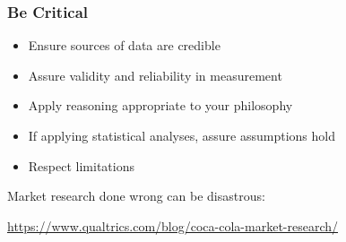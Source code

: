 \begin{frame}
	\frametitle{Be Critical}
	
	\begin{itemize}
		\item Ensure sources of data are credible
		\item Assure validity and reliability in measurement
		\item Apply reasoning appropriate to your philosophy
		\item If applying statistical analyses, assure assumptions hold
		\item Respect limitations
	\end{itemize}
	
	Market research done wrong can be disastrous:
	
	\vspace{1em}
	
	\url{https://www.qualtrics.com/blog/coca-cola-market-research/}
	
\end{frame}



